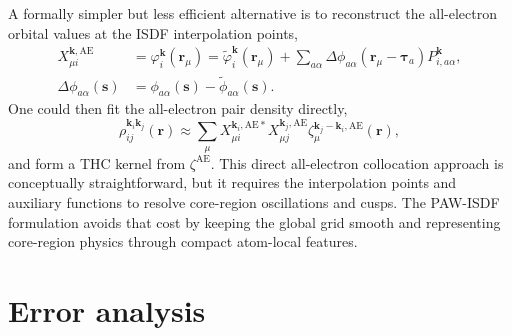 \documentclass[aps,prb,reprint,superscriptaddress,longbibliography,nofootinbib]{revtex4-2}
\newcommand{\br}{\mathbf r}
\newcommand{\bk}{\mathbf k}
\newcommand{\btau}{\boldsymbol\tau}
\begin{document}
A formally simpler but less efficient alternative is to reconstruct the all-electron orbital values at the ISDF interpolation points,
\begin{subequations}
\begin{align}
X_{\mu i}^{\bk,\mathrm{AE}}
&=
\varphi_i^{\bk}(\br_\mu)
=
\widetilde\varphi_i^{\bk}(\br_\mu)
+
\sum_{a\alpha}
\Delta\phi_{a\alpha}(\br_\mu-\btau_a)
P_{i,a\alpha}^{\bk},
\label{eq:direct-ae-x}\\
\Delta\phi_{a\alpha}(\mathbf s)
&=\phi_{a\alpha}(\mathbf s)-\widetilde\phi_{a\alpha}(\mathbf s).
\end{align}
\end{subequations}
One could then fit the all-electron pair density directly,
\begin{equation}
\rho_{ij}^{\bk_i\bk_j}(\br)
\approx
\sum_\mu X_{\mu i}^{\bk_i,\mathrm{AE} *}X_{\mu j}^{\bk_j,\mathrm{AE}}
\zeta_\mu^{\bk_j-\bk_i,\mathrm{AE}}(\br),
\label{eq:direct-ae-isdf}
\end{equation}
and form a THC kernel from \(\zeta^{\mathrm{AE}}\).  This direct all-electron collocation approach is conceptually straightforward, but it requires the interpolation points and auxiliary functions to resolve core-region oscillations and cusps.  The PAW-ISDF formulation avoids that cost by keeping the global grid smooth and representing core-region physics through compact atom-local features.

\section{Error analysis}
\label{sec:error}
\end{document}
